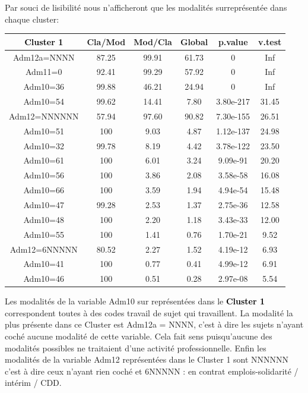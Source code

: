 \documentclass{book}
\begin{document}
\noindent
Par souci de lisibilité nous n'afficheront que les modalités surreprésentée dans chaque cluster:

\setlength\arrayrulewidth{2pt}
\begin{tabular}{|c||ccccc|}
\hline
  \textbf{\textcolor{black}{Cluster 1}}       &    Cla/Mod  &   Mod/Cla   &   Global   &    p.value  &   v.test  \\
\hline
\hline 
            
Adm12a=NNNN  & 87.25 &99.91 &61.73  &0 &       Inf\\
Adm11=0      & 92.41 &99.29 &57.92  &0 &       Inf\\
Adm10=36     & 99.88 &46.21 &24.94  &0 &      Inf\\
Adm10=54     & 99.62 &14.41 & 7.80 &3.80e-217  &31.45\\
Adm12=NNNNNN & 57.94 &97.60 &90.82 &7.30e-155 & 26.51\\
Adm10=51     & 100 & 9.03 & 4.87 &1.12e-137  &24.98\\
Adm10=32     & 99.78 & 8.19 & 4.42 &3.78e-122  &23.50\\
Adm10=61     & 100 & 6.01 & 3.24 & 9.09e-91 & 20.20\\
Adm10=56     & 100 & 3.86 & 2.08 & 3.58e-58 & 16.08\\
Adm10=66     & 100 & 3.59 & 1.94 & 4.94e-54 & 15.48\\
Adm10=47     & 99.28 & 2.53 & 1.37 & 2.75e-36 & 12.58\\
Adm10=48    & 100 & 2.20 & 1.18 & 3.43e-33 & 12.00\\
Adm10=55    & 100& 1.41 & 0.76 & 1.70e-21 &  9.52\\
Adm12=6NNNNN & 80.52 & 2.27 & 1.52 & 4.19e-12  & 6.93\\
Adm10=41    & 100 & 0.77 & 0.41 & 4.99e-12 &  6.91\\
Adm10=46    & 100 &0.51 & 0.28 & 2.97e-08 &  5.54\\
\hline
\end{tabular}

\bigskip
Les modalités de la variable Adm10 sur représentées dans le \textbf{\textcolor{black}{Cluster 1}} correspondent toutes à des codes travail de sujet qui travaillent. La modalité la plus présente dans ce Cluster est Adm12a = NNNN, c'est à dire les sujets n'ayant coché aucune modalité de cette variable. Cela fait sens puisqu'aucune des modalités possibles ne traitaient d'une activité professionnelle. Enfin les modalités de la variable Adm12 représentées dans le Cluster 1 sont NNNNNN c'est à dire ceux n'ayant rien coché et 6NNNNN : en contrat emplois-solidarité / intérim / CDD.
\end{document}
